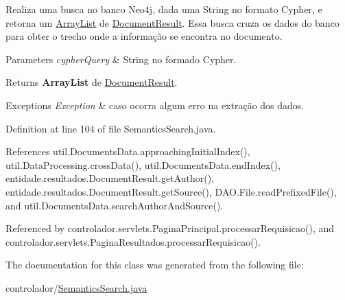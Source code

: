 Realiza uma busca no banco Neo4j, dada uma String no formato Cypher, e retorna um \hyperlink{}{Array\+List} de \hyperlink{}{Document\+Result}. Essa busca cruza os dados do banco para obter o trecho onde a informação se encontra no documento.


\begin{DoxyParams}{Parameters}
{\em cypher\+Query} & String no formado Cypher. \\
\hline
\end{DoxyParams}
\begin{DoxyReturn}{Returns}
{\bfseries Array\+List} de \hyperlink{}{Document\+Result}. 
\end{DoxyReturn}

\begin{DoxyExceptions}{Exceptions}
{\em Exception} & caso ocorra algum erro na extração dos dados. \\
\hline
\end{DoxyExceptions}


Definition at line 104 of file Semantics\+Search.\+java.



References util.\+Documents\+Data.\+approaching\+Initial\+Index(), util.\+Data\+Processing.\+cross\+Data(), util.\+Documents\+Data.\+end\+Index(), entidade.\+resultados.\+Document\+Result.\+get\+Author(), entidade.\+resultados.\+Document\+Result.\+get\+Source(), D\+A\+O.\+File.\+read\+Prefixed\+File(), and util.\+Documents\+Data.\+search\+Author\+And\+Source().



Referenced by controlador.\+servlets.\+Pagina\+Principal.\+processar\+Requisicao(), and controlador.\+servlets.\+Pagina\+Resultados.\+processar\+Requisicao().



The documentation for this class was generated from the following file\+:\begin{DoxyCompactItemize}
\item 
controlador/\hyperlink{SemanticsSearch_8java}{Semantics\+Search.\+java}\end{DoxyCompactItemize}
